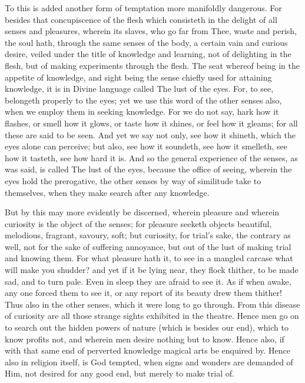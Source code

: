 \documentclass[b5paper,openright,12pt,twoside]{book}
\begin{document}
To this is added another form of temptation more manifoldly dangerous.
For besides that concupiscence of the flesh which consisteth in the
delight of all senses and pleasures, wherein its slaves, who go far from
Thee, waste and perish, the soul hath, through the same senses of the
body, a certain vain and curious desire, veiled under the title of
knowledge and learning, not of delighting in the flesh, but of making
experiments through the flesh. The seat whereof being in the appetite
of knowledge, and sight being the sense chiefly used for attaining
knowledge, it is in Divine language called The lust of the eyes. For, to
see, belongeth properly to the eyes; yet we use this word of the other
senses also, when we employ them in seeking knowledge. For we do not
say, hark how it flashes, or smell how it glows, or taste how it shines,
or feel how it gleams; for all these are said to be seen. And yet we
say not only, see how it shineth, which the eyes alone can perceive; but
also, see how it soundeth, see how it smelleth, see how it tasteth,
see how hard it is. And so the general experience of the senses, as
was said, is called The lust of the eyes, because the office of seeing,
wherein the eyes hold the prerogative, the other senses by way
of similitude take to themselves, when they make search after any
knowledge.

But by this may more evidently be discerned, wherein pleasure and
wherein curiosity is the object of the senses; for pleasure seeketh
objects beautiful, melodious, fragrant, savoury, soft; but curiosity,
for trial's sake, the contrary as well, not for the sake of suffering
annoyance, but out of the lust of making trial and knowing them. For
what pleasure hath it, to see in a mangled carcase what will make you
shudder? and yet if it be lying near, they flock thither, to be made
sad, and to turn pale. Even in sleep they are afraid to see it. As if
when awake, any one forced them to see it, or any report of its beauty
drew them thither! Thus also in the other senses, which it were long to
go through. From this disease of curiosity are all those strange sights
exhibited in the theatre. Hence men go on to search out the hidden
powers of nature (which is besides our end), which to know profits not,
and wherein men desire nothing but to know. Hence also, if with that
same end of perverted knowledge magical arts be enquired by. Hence also
in religion itself, is God tempted, when signs and wonders are demanded
of Him, not desired for any good end, but merely to make trial of.
\end{document}
